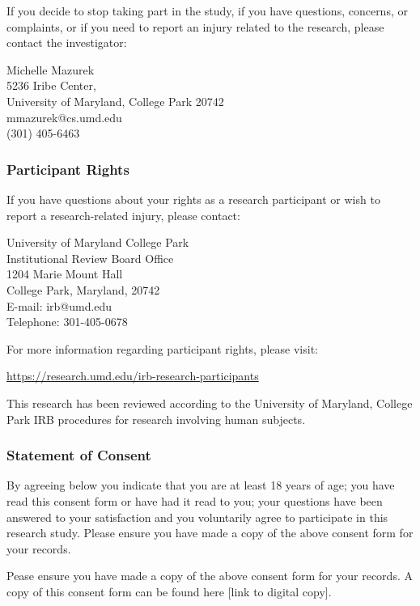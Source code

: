 \documentclass{article}
\begin{document}
If you decide to stop taking part in the study, if you have questions, concerns, or complaints, or if you need to report an injury related to the research, please contact the investigator:

{\centering
Michelle Mazurek \\
5236 Iribe Center, \\University of Maryland, College Park 20742\\
mmazurek@cs.umd.edu\\
(301) 405-6463\\}

\subsubsection{Participant Rights}
If you have questions about your rights as a research participant or wish to report a research-related injury, please contact: 

{\centering
University of Maryland College Park \\
Institutional Review Board Office\\
1204 Marie Mount Hall \\
College Park, Maryland, 20742 \\
E-mail: irb@umd.edu \\
Telephone: 301-405-0678 \\}

\vspace{5pt}
For more information regarding participant rights, please visit:

\url{https://research.umd.edu/irb-research-participants}

This research has been reviewed according to the University of Maryland, College Park IRB procedures for research involving human subjects.

\subsubsection{Statement of Consent}
By agreeing below you indicate that you are at least 18 years of age; you have read this consent form or have had it read to you; your questions have been answered to your satisfaction and you voluntarily agree to participate in this research study. 
Please ensure you have made a copy of the above consent form for your records.

Pease ensure you have made a copy of the above consent form for your records. A copy of this consent form can be found here [link to digital copy].
\end{document}
